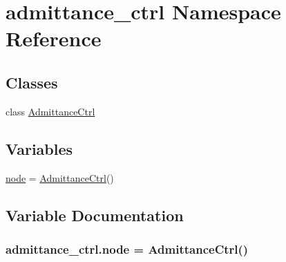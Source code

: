 \hypertarget{namespaceadmittance__ctrl}{}\section{admittance\+\_\+ctrl Namespace Reference}
\label{namespaceadmittance__ctrl}
\subsection*{Classes}
\begin{DoxyCompactItemize}
\item 
class \hyperlink{classadmittance__ctrl_1_1_admittance_ctrl}{Admittance\+Ctrl}
\end{DoxyCompactItemize}
\subsection*{Variables}
\begin{DoxyCompactItemize}
\item 
\hyperlink{namespaceadmittance__ctrl_afea3593bd3ba80364f80f609075607fb}{node} = \hyperlink{classadmittance__ctrl_1_1_admittance_ctrl}{Admittance\+Ctrl}()
\end{DoxyCompactItemize}


\subsection{Variable Documentation}
\subsubsection[{\texorpdfstring{node}{node}}]{\setlength{\rightskip}{0pt plus 5cm}admittance\+\_\+ctrl.\+node = {\bf Admittance\+Ctrl}()}\hypertarget{namespaceadmittance__ctrl_afea3593bd3ba80364f80f609075607fb}{}\label{namespaceadmittance__ctrl_afea3593bd3ba80364f80f609075607fb}
